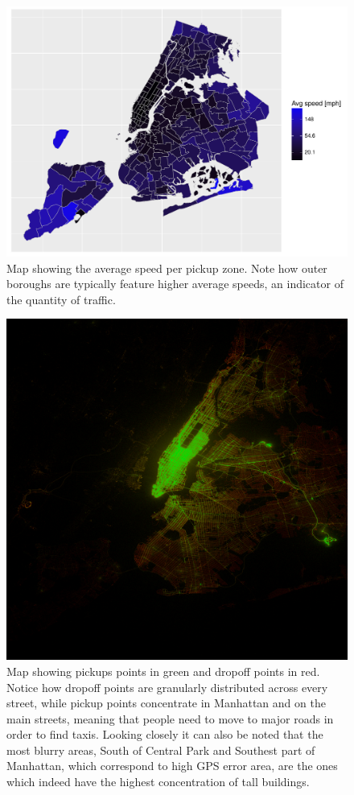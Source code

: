 \documentclass{acm_proc_article-sp-sigmod09}
\begin{document}
\begin{figure}
	\centering
	\includegraphics[width=1\columnwidth]{resources/base_plots/avg_speed_by_pickup_location_map.pdf}
	\caption{Map showing the average speed per pickup zone. Note how outer boroughs are typically feature higher average speeds, an indicator of the quantity of traffic.}
	\label{fig:speedMap}
\end{figure}

\begin{figure}
	\centering
	\includegraphics[width=1\columnwidth]{resources/base_plots/pickup_vs_dropoff.png}
	\caption{Map showing pickups points in green and dropoff points in red. Notice how dropoff points are granularly distributed across every street, while pickup points concentrate in Manhattan and on the main streets, meaning that people need to move to major roads in order to find taxis. Looking closely it can also be noted that the most blurry areas, South of Central Park and Southest part of Manhattan, which correspond to high GPS error area, are the ones which indeed have the highest concentration of tall buildings.}
	\label{fig:pickupDropoffImageMap}
\end{figure}
\end{document}
